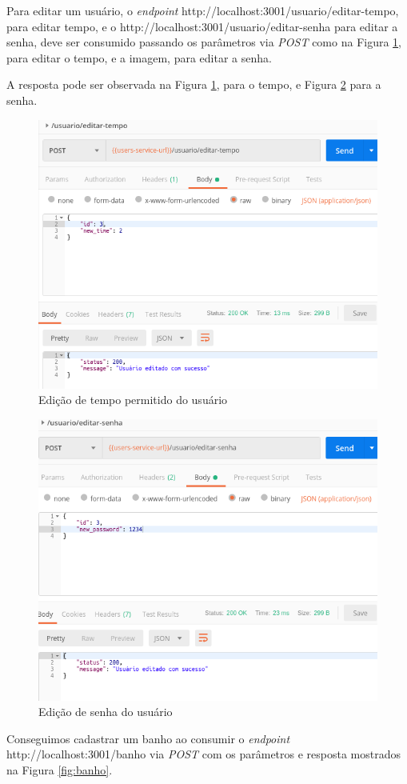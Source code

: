 Para editar um usuário, o \textit{endpoint} http://localhost:3001/usuario/editar-tempo, para editar tempo, e o http://localhost:3001/usuario/editar-senha para editar a senha, deve ser consumido passando os parâmetros via \textit{POST} como na Figura \ref{fig:tempo}, para editar o tempo, e a imagem, para editar a senha.

A resposta pode ser observada na Figura \ref{fig:tempo}, para o tempo, e Figura \ref{fig:senha} para a senha.

\begin{figure}[htbp]
	\centering
	\includegraphics[width=0.7\linewidth]{figuras/postman/time.png}
	\caption{Edição de tempo permitido do usuário}
	\label{fig:tempo}
\end{figure}

\begin{figure}[htbp]
	\centering
	\includegraphics[width=0.7\linewidth]{figuras/postman/password.png}
	\caption{Edição de senha do usuário}
	\label{fig:senha}
\end{figure}

Conseguimos cadastrar um banho ao consumir o \textit{endpoint} http://localhost:3001/banho via \textit{POST} com os parâmetros e resposta mostrados na Figura \ref{fig:banho}.

